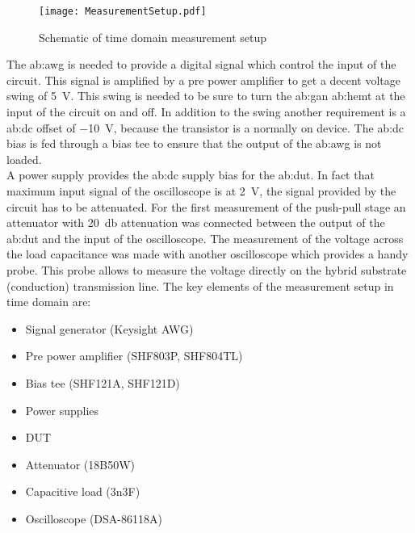 \begin{figure}[htb!]
	\centering
  \texttt{[image: MeasurementSetup.pdf]}
	\caption{Schematic of time domain measurement setup}
	\label{fig:SchematicMeasSetup}
\end{figure}


The \gls{ab:awg} is needed to provide a digital signal which control the input of the circuit.
This signal is amplified by a pre power amplifier to get a decent voltage swing of \SI{5}{\volt}.
This swing is needed to be sure to turn the \gls{ab:gan} \gls{ab:hemt} at the input of the circuit on and off.
In addition to the swing another requirement is a \gls{ab:dc} offset of \SI{-10}{\volt}, because the transistor is a normally on device.
The \gls{ab:dc} bias is fed through a bias tee to ensure that the output of the \gls{ab:awg} is not loaded.\\
A power supply provides the \gls{ab:dc} supply bias for the \gls{ab:dut}.
In fact that maximum input signal of the oscilloscope is at \SI{2}{\volt}, the signal provided by the circuit has to be attenuated.
For the first measurement of the push-pull stage an attenuator with \SI{20}{\decibel} attenuation was connected between the output of the \gls{ab:dut} and the input of the oscilloscope.
The measurement of the voltage across the load capacitance was made with another oscilloscope which provides a handy probe.
This probe allows to measure the voltage directly on the hybrid substrate (conduction) transmission line.
The key elements of the measurement setup in time domain are:
\begin{itemize}
	\item Signal generator (Keysight AWG)
	\item Pre power amplifier (SHF803P, SHF804TL)
	\item Bias tee (SHF121A, SHF121D)
	\item Power supplies
	\item DUT
	\item Attenuator (18B50W)
	\item Capacitive load (3n3F)
	\item Oscilloscope (DSA-86118A)
	
\end{itemize}

